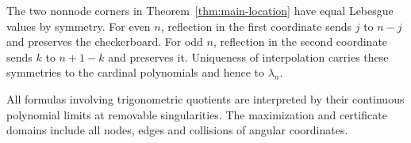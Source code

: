 The two nonnode corners in Theorem~\ref{thm:main-location} have equal
Lebesgue values by symmetry. For even $n$, reflection in the first
coordinate sends $j$ to $n-j$ and preserves the checkerboard. For odd
$n$, reflection in the second coordinate sends $k$ to $n+1-k$ and
preserves it. Uniqueness of interpolation carries these symmetries to
the cardinal polynomials and hence to $\lambda_n$.

\begin{remark}
All formulas involving trigonometric quotients are interpreted by their
continuous polynomial limits at removable singularities. The maximization
and certificate domains include all nodes, edges and collisions of angular
coordinates.
\end{remark}
